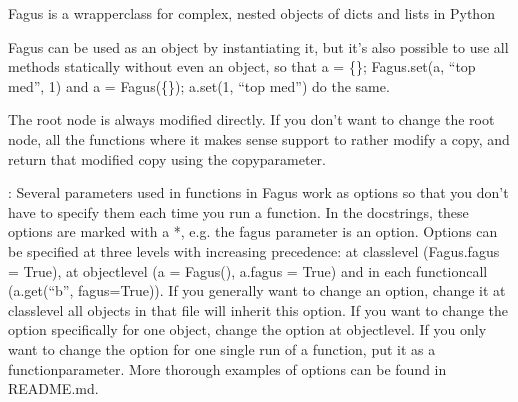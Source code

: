 \documentclass[a4paper,10pt,english]{sphinxmanual}
\begin{document}
\begin{fulllineitems}
\sphinxAtStartPar
Fagus is a wrapper\sphinxhyphen{}class for complex, nested objects of dicts and lists in Python

\sphinxAtStartPar
Fagus can be used as an object by instantiating it, but it’s also possible to use all methods statically without
even an object, so that a = \{\}; Fagus.set(a, “top med”, 1) and a = Fagus(\{\}); a.set(1, “top med”) do the same.

\sphinxAtStartPar
The root node is always modified directly. If you don’t want to change the root node, all the functions where it
makes sense support to rather modify a copy, and return that modified copy using the copy\sphinxhyphen{}parameter.

\sphinxAtStartPar
{}:
Several parameters used in functions in Fagus work as options so that you don’t have to specify them each time you
run a function. In the docstrings, these options are marked with a *, e.g. the fagus parameter is an option.
Options can be specified at three levels with increasing precedence: at class\sphinxhyphen{}level (Fagus.fagus = True), at
object\sphinxhyphen{}level (a = Fagus(), a.fagus = True) and in each function\sphinxhyphen{}call (a.get(“b”, fagus=True)). If you generally want
to change an option, change it at class\sphinxhyphen{}level \sphinxhyphen{} all objects in that file will inherit this option. If you want to
change the option specifically for one object, change the option at object\sphinxhyphen{}level. If you only want to change the
option for one single run of a function, put it as a function\sphinxhyphen{}parameter. More thorough examples of options can be
found in README.md.


\end{fulllineitems}
\end{document}
